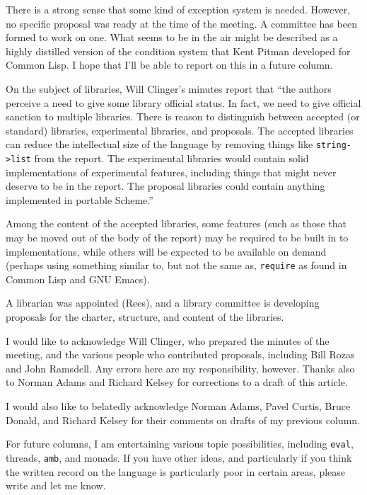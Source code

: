 
There is a strong sense that some kind of exception system is needed.
However, no specific proposal was ready at the time of the meeting.  A
committee has been formed to work on one.  What seems to be in the
air might be described as a highly distilled version of the condition
system that Kent Pitman developed for Common Lisp.  I hope that I'll
be able to report on this in a future column.


On the subject of libraries, Will Clinger's minutes report that
``the authors perceive a need to give some library official status.  In
fact, we need to give official sanction to multiple libraries.  There
is reason to distinguish between accepted (or standard) libraries,
experimental libraries, and proposals.  The accepted libraries can
reduce the intellectual size of the language by removing things like
{\tt string->list} from the report.  The experimental libraries would
contain solid implementations of experimental features, including
things that might never deserve to be in the report.  The proposal
libraries could contain anything implemented in portable Scheme.''


Among the content of the accepted libraries, some features (such as
those that may be moved out of the body of the report) may be required
to be built in to implementations, while others will be expected to be
available on demand (perhaps using something similar to, but not the
same as, {\tt require} as found in Common Lisp and GNU Emacs).

A librarian was appointed (Rees), and a library committee is
developing proposals for the charter, structure, and content of the
libraries.


\separator

I would like to acknowledge Will Clinger, who prepared the minutes of
the meeting, and the various people who contributed proposals,
including Bill Rozas and John Ramsdell.  Any errors here are my
responsibility, however.  Thanks also to Norman Adams and Richard
Kelsey for corrections to a draft of this article.

I would also like to belatedly acknowledge Norman Adams, Pavel
Curtis, Bruce Donald, and Richard Kelsey for their comments on drafts of
my previous column.

For future columns, I am entertaining various topic possibilities,
including {\tt eval}, threads, {\tt amb}, and monads.
If you have other ideas, and particularly if you think the written
record on the language is particularly poor in certain areas, please
write and let me know.

